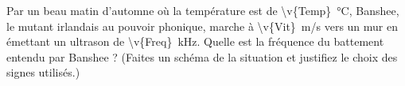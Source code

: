 Par un beau matin d’automne où la température est de \qty{\v{Temp}}{\degreeCelsius}, Banshee, le mutant irlandais au pouvoir phonique, marche à \qty{\v{Vit}}{m/s} vers un mur en émettant un ultrason de \qty{\v{Freq}}{kHz}. Quelle est la fréquence du battement entendu par Banshee ? (Faites un schéma de la situation et justifiez le choix des signes utilisés.)